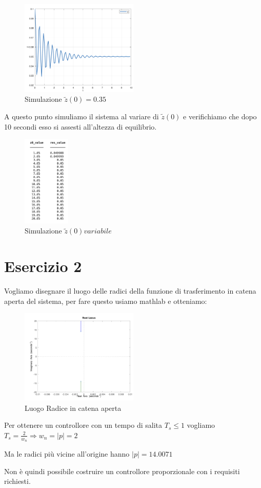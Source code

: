 \documentclass{article}
\newcommand{\spacer}[1][8pt]{
    \par\vspace{#1}
}
\begin{document}
\begin{figure}[H]
    \centering
    \includegraphics[width = 0.5\textwidth]{Images/simulazione-d-0.1.png}
    \caption{Simulazione $\tilde{z}(0)=0.35$}
    \label{fig:simulazione_d_0.1}
\end{figure}

\spacer
A questo punto simuliamo il sistema al variare di $\tilde{z}(0)$ e verifichiamo che dopo 10 secondi esso si assesti all'altezza di equilibrio.

\begin{figure}[H]
    \centering
    \includegraphics[width = 0.2\textwidth]{Images/risultati-simulazioni.png}
    \caption{Simulazione $\tilde{z}(0) variabile$}
    \label{fig:simulazione_z_variabile}
\end{figure}

\section{Esercizio 2}
Vogliamo disegnare il luogo delle radici della funzione di trasferimento in catena aperta del sistema, per fare questo usiamo mathlab e otteniamo:

\begin{figure}[H]
    \centering
    \includegraphics[width = 0.5\textwidth]{Images/luogo-radici-proporzionale.png}
    \caption{Luogo Radice in catena aperta}
    \label{fig:luogo_radice_catena_aperta}
\end{figure}

Per ottenere un controllore con un tempo di salita $T_s \le 1$ vogliamo $T_s = \frac{2}{w_n} \Rightarrow w_n = |p| = 2$

Ma le radici più vicine all'origine hanno $|p| = 14.0071$

Non è quindi possibile costruire un controllore proporzionale con i requisiti richiesti.
\end{document}
